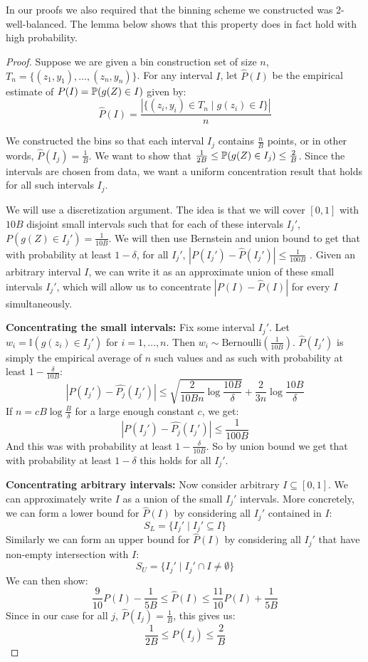 In our proofs we also required that the binning scheme we constructed was 2-well-balanced. The lemma below shows that this property does in fact hold with high probability.

\wellBalanced*{}

\begin{proof}
Suppose we are given a bin construction set of size $n$, $T_n = \{(z_1, y_1), \dots, (z_n, y_n)\}$.
For any interval $I$, let $\hat{P}(I)$ be the empirical estimate of $P(I) = \mathbb{P}(g(Z) \in I)$ given by:
\[ \hat{P}(I) = \frac{|\{(z_i, y_i) \in T_n \mid g(z_i) \in I\}|}{n} \]

We constructed the bins so that each interval $I_j$ contains $\frac{n}{B}$ points, or in other words, $\hat{P}(I_j) = \frac{1}{B}$. We want to show that $\frac{1}{2B} \leq \mathbb{P}(g(Z) \in I_j) \leq \frac{2}{B}$. Since the intervals are chosen from data, we want a uniform concentration result that holds for all such intervals $I_j$.

We will use a discretization argument. The idea is that we will cover $[0, 1]$ with $10B$ disjoint small intervals such that for each of these intervals $I_j'$, $P(g(Z) \in I_j') = \frac{1}{10B}$. We will then use Bernstein and union bound to get that with probability at least $1 - \delta$, for all $I_j'$, $|P(I_j') - \hat{P}(I_j')| \leq \frac{1}{100B}$ . Given an arbitrary interval $I$, we can write it as an approximate union of these small intervals $I_j'$, which will allow us to concentrate $|P(I) - \hat{P}(I)|$ for every $I$ simultaneously.

\textbf{Concentrating the small intervals:} Fix some interval $I_j'$. Let $w_i = \mathbb{I}(g(z_i) \in I_j')$ for $i = 1,\dots,n$. Then $w_i \sim \mbox{Bernoulli}(\frac{1}{10B})$. $\hat{P}(I_j')$ is simply the empirical average of $n$ such values and as such with probability at least $1 - \frac{\delta}{10B}$:
\[ |P(I_j') - \hat{P_j}(I_j')| \leq \sqrt{\frac{2}{10Bn} \log{\frac{10B}{\delta}}} + \frac{2}{3n} \log{\frac{10B}{\delta}} \]
If $n = cB \log{\frac{B}{\delta}}$ for a large enough constant $c$, we get:
\[ |P(I_j') - \hat{P_j}(I_j')| \leq \frac{1}{100B} \]
And this was with probability at least $1 - \frac{\delta}{10B}$. So by union bound we get that with probability at least $1 - \delta$ this holds for all $I_j'$.

\textbf{Concentrating arbitrary intervals:} Now consider arbitrary $I \subseteq [0, 1]$. We can approximately write $I$ as a union of the small $I_j'$ intervals. More concretely, we can form a lower bound for $\hat{P}(I)$ by considering all $I_j'$ contained in $I$:
\[ S_L = \{I_j' \mid I_j' \subseteq I \} \]
Similarly we can form an upper bound for $\hat{P}(I)$ by considering all $I_j'$ that have non-empty intersection with $I$:
\[ S_U = \{I_j' \mid I_j' \cap I \neq \emptyset \} \]
We can then show:
\[  \frac{9}{10} P(I) - \frac{1}{5B} \leq \hat{P}(I) \leq \frac{11}{10} P(I) + \frac{1}{5B} \]
Since in our case for all $j$, $\hat{P}(I_j) = \frac{1}{B}$, this gives us:
\[ \frac{1}{2B} \leq P(I_j) \leq \frac{2}{B} \]
\end{proof}

